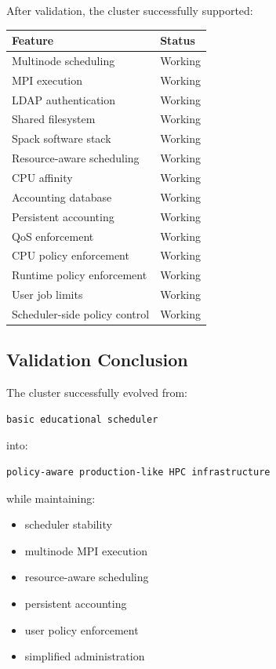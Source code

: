 \documentclass[11pt]{article}
\begin{document}
After validation, the cluster successfully supported:

\begin{center}
\begin{tabular}{ll}
Feature & Status\\
\hline
Multinode scheduling & Working\\
MPI execution & Working\\
LDAP authentication & Working\\
Shared filesystem & Working\\
Spack software stack & Working\\
Resource-aware scheduling & Working\\
CPU affinity & Working\\
Accounting database & Working\\
Persistent accounting & Working\\
QoS enforcement & Working\\
CPU policy enforcement & Working\\
Runtime policy enforcement & Working\\
User job limits & Working\\
Scheduler-side policy control & Working\\
\end{tabular}
\end{center}
\subsection{Validation Conclusion}
\label{sec:org8c1a3e9}

The cluster successfully evolved from:

\begin{verbatim}
basic educational scheduler
\end{verbatim}

into:

\begin{verbatim}
policy-aware production-like HPC infrastructure
\end{verbatim}

while maintaining:

\begin{itemize}
\item scheduler stability
\item multinode MPI execution
\item resource-aware scheduling
\item persistent accounting
\item user policy enforcement
\item simplified administration
\end{itemize}
\end{document}
